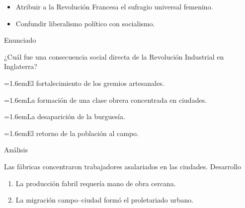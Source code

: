 \documentclass[10pt,a4paper,twocolumn]{article}
\newcommand{\alternativa}[2]{\par\noindent\hangindent=1.6em\hangafter=1\makebox[1.6em][l]{\tecla{#1}}#2\par}
\newcommand{\clave}[1]{\par\smallskip{\sffamily\footnotesize\color{esmeralda} Clave \teclaok{#1}}\par}
\begin{document}
\begin{errorfrecuente}
\begin{itemize}
  \item Atribuir a la Revolución Francesa el sufragio universal femenino.
  \item Confundir liberalismo político con socialismo.
\end{itemize}
\end{errorfrecuente}

\begin{ejemplo}
{\sffamily\footnotesize\color{zinc500} Enunciado}\par
¿Cuál fue una consecuencia social directa de la Revolución Industrial en Inglaterra?
\alternativa{A}{El fortalecimiento de los gremios artesanales.}
\alternativa{B}{La formación de una clase obrera concentrada en ciudades.}
\alternativa{C}{La desaparición de la burguesía.}
\alternativa{D}{El retorno de la población al campo.}
\clave{B}
{\sffamily\footnotesize\color{zinc500} Análisis}\par Las fábricas concentraron trabajadores asalariados en las ciudades.
{\sffamily\footnotesize\color{zinc500} Desarrollo}
\begin{enumerate}
  \item La producción fabril requería mano de obra cercana.
  \item La migración campo–ciudad formó el proletariado urbano.
\end{enumerate}
\end{ejemplo}
\end{document}
